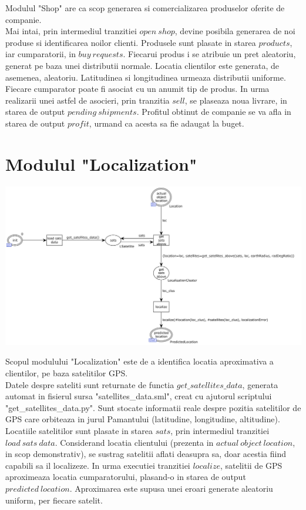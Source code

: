 \begin{spacing}{1.5}
Modulul "Shop" are ca scop generarea si comercializarea produselor oferite de companie.\\
Mai intai, prin intermediul tranzitiei $open\ shop$, devine posibila generarea de noi produse si
identificarea noilor clienti. Produsele sunt plasate in starea $products$, iar cumparatorii, in
$buy\ requests$. Fiecarui produs i se atribuie un pret aleatoriu, generat pe baza unei distributii normale.
Locatia clientilor este generata, de asemenea, aleatoriu. Latitudinea si longitudinea urmeaza distributii
uniforme. Fiecare cumparator poate fi asociat cu un anumit tip de produs. In urma realizarii unei astfel de
asocieri, prin tranzitia $sell$, se plaseaza noua livrare, in starea de output $pending\ shipments$.
Profitul obtinut de companie se va afla in starea de output $profit$, urmand ca acesta sa fie adaugat la
buget.

\section{Modulul "Localization"}

\includegraphics[width=\textwidth]{./Parts/Chapter1/Localization.png}

Scopul modulului "Localization" este de a identifica locatia aproximativa a clientilor, pe baza satelitilor
GPS.\\
Datele despre sateliti sunt returnate de functia $get\_satellites\_data$, generata automat in fisierul sursa
"satellites\_data.sml", creat cu ajutorul scriptului "get\_satellites\_data.py". Sunt stocate informatii
reale despre pozitia satelitilor de GPS care orbiteaza in jurul Pamantului (latitudine, longitudine,
altitudine).\\
Locatiile satelitilor sunt plasate in starea $sats$, prin intermediul tranzitiei $load\ sats\ data$.
Considerand locatia clientului (prezenta in $actual\ object\ location$, in scop demonstrativ), se sustrag
satelitii aflati deasupra sa, doar acestia fiind capabili sa il localizeze. In urma executiei tranzitiei
$localize$, satelitii de GPS aproximeaza locatia cumparatorului, plasand-o in starea de output
$predicted\ location$. Aproximarea este supusa unei eroari generate aleatoriu uniform, per fiecare satelit.


\end{spacing}

